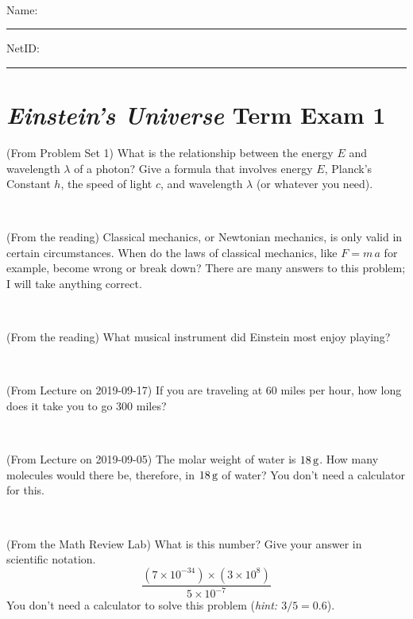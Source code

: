 \documentclass[12pt, letterpaper]{article}
\begin{document}
\vfill ~


\cleardoublepage



\noindent
Name: \rule[-1ex]{0.60\textwidth}{0.1pt}
NetID: \rule[-1ex]{0.20\textwidth}{0.1pt}

\section*{\textsl{Einstein's Universe} Term Exam 1}
\setcounter{problem}{1}


\begin{problem} (From Problem Set 1)
What is the relationship between the energy $E$ and wavelength
$\lambda$ of a photon? Give a formula that involves energy $E$,
Planck's Constant $h$, the speed of light $c$, and wavelength
$\lambda$ (or whatever you need).
\end{problem}

\vfill ~

\begin{problem} (From the reading)
Classical mechanics, or Newtonian mechanics, is only valid in certain
circumstances. When do the laws of classical mechanics, like $F =
m\,a$ for example, become wrong or break down? There are many answers
to this problem; I will take anything correct.
\end{problem}


\vfill ~

\begin{problem} (From the reading)
What musical instrument did Einstein most enjoy playing?
\end{problem}


\vfill ~

\begin{problem} (From Lecture on 2019-09-17)
If you are traveling at 60 miles per hour, how long does
it take you to go 300 miles?
\end{problem}


\vfill ~


\clearpage


\begin{problem} (From Lecture on 2019-09-05)
The molar weight of water is $18\,\mathrm{g}$. How many molecules would there
be, therefore, in $18\,\mathrm{g}$ of water? You don't need a calculator for
this.
\end{problem}


\vfill ~

\begin{problem} (From the Math Review Lab)
What is this number? Give your answer in scientific notation.
$$
\frac{(7\times10^{-34})\times(3\times10^8)}{5\times10^{-7}}
$$
You don't need a calculator to solve this problem (\textit{hint: $3/5=0.6$}).
\end{problem}
\end{document}
